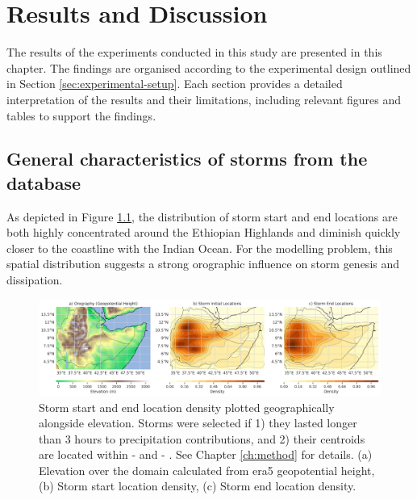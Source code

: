 \chapter{Results and Discussion}
\label{ch:results}

The results of the experiments conducted in this study are presented in this chapter. The findings are organised according to the experimental design outlined in Section \ref{sec:experimental-setup}. Each section provides a detailed interpretation of the results and their limitations, including relevant figures and tables to support the findings.

\section{General characteristics of storms from the database}

As depicted in Figure \ref{fig:orography_storm_init_end_kde}, the distribution of storm start and end locations are both highly concentrated around the Ethiopian Highlands and diminish quickly closer to the coastline with the Indian Ocean. For the modelling problem, this spatial distribution suggests a strong orographic influence on storm genesis and dissipation.

\begin{figure}[ht]
    \centering
    \includegraphics[width=\textwidth]{../figures/generated/exploration/orography_storm_init_end_kde.png}
    \caption{Storm start and end location density plotted geographically alongside elevation. Storms were selected if 1) they lasted longer than 3 hours to precipitation contributions, and 2) their centroids are located within  -  and  -  \citep{Hill2023}. See Chapter \ref{ch:method} for details. (a) Elevation over the domain calculated from \acrshort{era5} geopotential height, (b) Storm start location density, (c) Storm end location density.}
    \label{fig:orography_storm_init_end_kde}
\end{figure}

